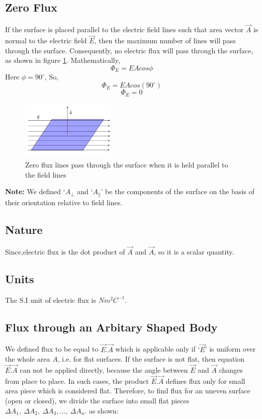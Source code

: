 \subsection*{Zero Flux}
If the surface is placed parallel to the electric field lines such that
area vector $\vec{A}$ is normal to the electric field $\vec{E}$,
then the maximum number of lines will pass through the surface. Consequently,
no electric flux will pass through the surface, as shown in figure
\ref{fig:11.12}.
Mathematically,
\begin{equation}
  \Phi_{E} = EAcos\phi \nonumber
\end{equation}
Here $\phi = 90^{\circ}$, So,
\begin{equation}
  \Phi_{E} = EAcos(90^{\circ}) \nonumber
\end{equation}
\begin{equation}
  \Phi_{E} = 0 \nonumber
\end{equation}

\begin{figure}[H]
  \centering
  \captionsetup{justification = centering}
  \includegraphics[width=0.4\textwidth]{Images/Chapter-11/11.12.png}
  \caption{Zero flux lines pass through the surface when it is held
  parallel to the field lines}
  \label{fig:11.12}
\end{figure}

\noindent\textbf{Note:} We defined `$A_{\bot}$ and `$A_{\parallel}$' be the components of the surface on the basis of
their orientation relative to field lines.

\subsection*{Nature}
Since,electric flux is the dot product of $\vec{A}$ and $\vec{A}$, so it is a scalar quantity.

\subsection*{Units}
The S.I unit of electric flux is $Nm^{2}C^{-1}$.
\subsection{Flux through an Arbitary Shaped Body}
We defined flux to be equal to $\vec{E}.\vec{A}$ which is applicable
only if `$\vec{E}$' is uniform over the whole area $A$, i.e. for flat surfaces.
If the surface is not flat, then equation $\vec{E}.\vec{A}$ can not be
applied directly, because the angle between $\vec{E}$ and $\vec{A}$ changes from place
to place. In such cases, the product $\vec{E}.\vec{A}$ defines flux only
for small area piece which is considered flat. Therefore, to find flux for
an uneven surface (open or closed), we divide the surface into small flat
pieces $\Delta A_{1},\:\Delta A_{2},\:\Delta A_{3},...,\:\Delta A_{n}$.
as shown:

